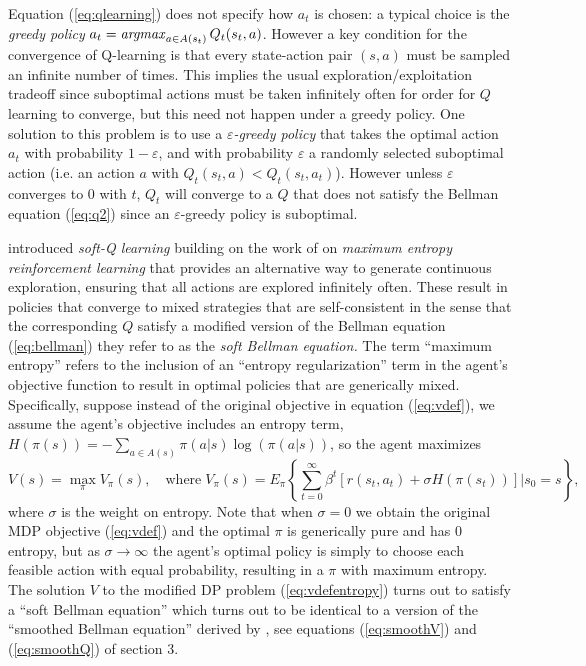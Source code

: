 Equation (\ref{eq:qlearning}) does not specify how $a_t$ is chosen: a typical choice is the {\it greedy policy\/}
$a_t = \mathop{\it argmax}_{a \in A(s_t)} Q_t(s_t,a)$. However a key condition for the convergence of Q-learning is 
that every state-action pair $(s,a)$ must be sampled an infinite
number of times. This implies the usual exploration/exploitation tradeoff since suboptimal actions must
be taken infinitely often for order for $Q$ learning to converge, but this need not happen under a greedy policy.
 One solution to this problem is to use a {\it $\varepsilon$-greedy policy\/} that takes the optimal action $a_t$
 with probability $1-\varepsilon$, and with probability $\varepsilon$ a randomly selected 
suboptimal action (i.e. an action $a$ with $Q_t(s_t,a)<Q_t(s_t,a_t)$). However unless $\varepsilon$ converges
to $0$ with $t$, $Q_t$ will converge to a $Q$ that does not satisfy the Bellman equation (\ref{eq:q2})
since an $\varepsilon$-greedy policy is suboptimal.

\citet{softqlearning:2017}  introduced {\it soft-Q learning\/} 
building  on the work of \citet{ziebart:2008} on {\it maximum entropy reinforcement learning\/}
that provides an alternative way to generate continuous exploration, ensuring that all actions are
explored infinitely often. These result in policies that converge to mixed strategies that are self-consistent in the 
sense that the corresponding $Q$ satisfy a modified version of the Bellman equation 
(\ref{eq:bellman}) they refer to as the {\it soft Bellman equation.\/} The term ``maximum entropy'' refers to the
inclusion of an ``entropy regularization'' term in the agent's objective function to result in optimal policies
that are generically  mixed. Specifically, suppose instead of the original objective in equation (\ref{eq:vdef}), we 
assume the agent's objective includes an entropy term, $H(\pi(s))=-\sum_{a \in A(s)}\pi(a|s)\log(\pi(a|s))$, so the
agent maximizes
\begin{equation}
       V(s)= \max_\pi  V_\pi(s),  \quad \mbox{where} \;  V_\pi(s) = E_\pi \left\{\sum_{t=0}^\infty \beta^t[r(s_t,a_t)+\sigma H(\pi(s_t))]| s_0=s\right\},
\label{eq:vdefentropy}
\end{equation}
where $\sigma$ is the weight on entropy. Note that when $\sigma=0$ we obtain the original MDP objective
(\ref{eq:vdef}) and the optimal $\pi$ is generically pure and has 0 entropy,
but as $\sigma \to \infty$ the agent's optimal policy is simply to choose each feasible action with
equal probability, resulting in a $\pi$ with maximum entropy.  The solution $V$ to the modified DP problem
(\ref{eq:vdefentropy}) turns out to satisfy a ``soft Bellman equation'' which  turns out to be identical
to a version of the ``smoothed Bellman equation'' derived by \citet{rust:1988}, 
see equations  (\ref{eq:smoothV}) and (\ref{eq:smoothQ}) of section 3. 

